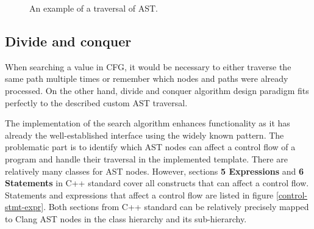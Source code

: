 \begin{figure}[h!]
\vspace{.5cm}
\centering
{}
\caption{An example of a traversal of AST.}
\label{prefetch-example-ast}
\end{figure}

\subsection{Divide and conquer}
When searching a value in CFG, it would be necessary to either traverse the same path multiple times or remember which nodes and paths were already processed. On the other hand, divide and conquer algorithm design paradigm fits perfectly to the described custom AST traversal.

The implementation of the search algorithm enhances  functionality as it has already the well-established interface using the widely known pattern. The problematic part is to identify which AST nodes can affect a control flow of a program and handle their traversal in the implemented template. There are relatively many classes for AST nodes. However, sections \textbf{5 Expressions} and \textbf{6 Statements} in C++ standard \cite{standard} cover all constructs that can affect a control flow. Statements and expressions that affect a control flow are listed in figure \ref{control-stmt-expr}. Both sections from C++ standard can be relatively precisely mapped to Clang AST nodes in the  class hierarchy and its  sub-hierarchy.


